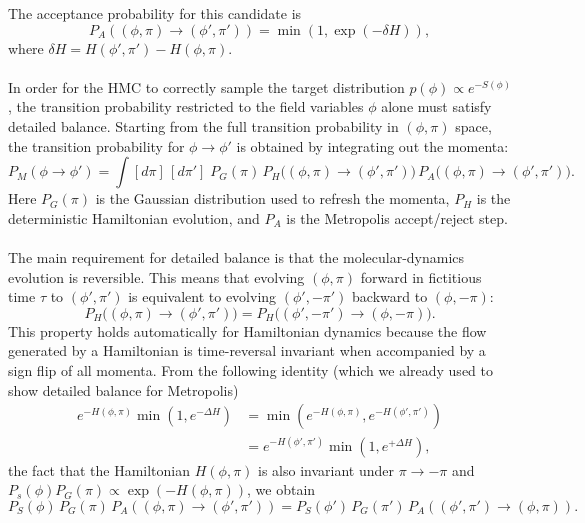 The acceptance probability for this candidate is 
\begin{equation}
    P_A((\phi, \pi) \rightarrow (\phi', \pi')) = \min \left( 1, \exp( -\delta H) \right), 
\end{equation}
where $\delta H = H(\phi', \pi') - H(\phi, \pi)$. \\\\
In order for the HMC to correctly sample the target distribution $p(\phi) \propto e^{-S(\phi)}$, the transition probability restricted to the field variables $\phi$ alone must 
satisfy detailed balance. Starting from the full transition probability in $(\phi,\pi)$ space, the 
transition probability for $\phi \to \phi'$ is obtained by integrating out the momenta:
\begin{equation}
    P_M(\phi \to \phi') = \int [d\pi]\,[d\pi']\; P_G(\pi)\, P_H\!\big((\phi,\pi)\to(\phi',\pi')\big)\,P_A\!\big((\phi,\pi)\to(\phi',\pi')\big).
\end{equation}
Here $P_G(\pi)$ is the Gaussian distribution used to refresh the momenta, $P_H$ is the deterministic 
Hamiltonian evolution, and $P_A$ is the Metropolis accept/reject step.\\\\
The main requirement for detailed balance is that the molecular-dynamics evolution is reversible. 
This means that evolving $(\phi,\pi)$ forward in fictitious time $\tau$ to $(\phi',\pi')$ is equivalent to evolving $(\phi', -\pi')$ backward to $(\phi,-\pi)$:
\begin{equation}
    P_H\!\big((\phi,\pi)\to(\phi',\pi')\big) = P_H\!\big((\phi', -\pi')\to(\phi,-\pi)\big).
\end{equation}
This property holds automatically for Hamiltonian dynamics because the flow generated by a Hamiltonian is time-reversal invariant when accompanied by a sign flip of all momenta.
From the following identity (which we already used to show detailed balance for Metropolis)
\begin{align}
    e^{-H(\phi,\pi)}\min(1, e^{-\Delta H}) &= \min\!\left(e^{-H(\phi,\pi)}, e^{-H(\phi',\pi')} \right) \\
    &= e^{-H(\phi',\pi')} \min(1, e^{+\Delta H}),
\end{align}
the fact that the Hamiltonian $H(\phi,\pi)$ is also invariant under $\pi \to -\pi$ and $P_s(\phi) P_G(\pi) \propto \exp (-H(\phi, \pi))$, we obtain
\begin{equation}
    P_S(\phi)\, P_G(\pi)\,P_A((\phi,\pi)\to(\phi',\pi')) = P_S(\phi')\, P_G(\pi')\,P_A((\phi',\pi')\to(\phi,\pi)).
\end{equation}
